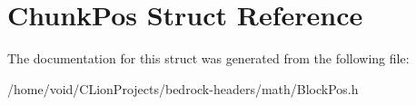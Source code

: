 \hypertarget{struct_chunk_pos}{}\section{Chunk\+Pos Struct Reference}
\label{struct_chunk_pos}


The documentation for this struct was generated from the following file\+:\begin{DoxyCompactItemize}
\item 
/home/void/\+C\+Lion\+Projects/bedrock-\/headers/math/Block\+Pos.\+h\end{DoxyCompactItemize}

